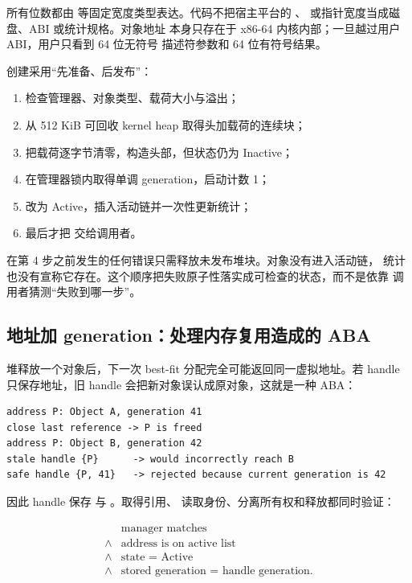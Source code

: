 所有位数都由  等固定宽度类型表达。代码不把宿主平台的
、 或指针宽度当成磁盘、ABI 或统计规格。对象地址
本身只存在于 x86-64 内核内部；一旦越过用户 ABI，用户只看到 64 位无符号
描述符参数和 64 位有符号结果。

创建采用“先准备、后发布”：

\begin{enumerate}
  \item 检查管理器、对象类型、载荷大小与溢出；
  \item 从 512 KiB 可回收 kernel heap 取得头加载荷的连续块；
  \item 把载荷逐字节清零，构造头部，但状态仍为 Inactive；
  \item 在管理器锁内取得单调 generation，启动计数 1；
  \item 改为 Active，插入活动链并一次性更新统计；
  \item 最后才把  交给调用者。
\end{enumerate}

在第 4 步之前发生的任何错误只需释放未发布堆块。对象没有进入活动链，
统计也没有宣称它存在。这个顺序把失败原子性落实成可检查的状态，而不是依靠
调用者猜测“失败到哪一步”。

\subsection{地址加 generation：处理内存复用造成的 ABA}

堆释放一个对象后，下一次 best-fit 分配完全可能返回同一虚拟地址。若 handle
只保存地址，旧 handle 会把新对象误认成原对象，这就是一种 ABA：

\begin{lstlisting}[caption={地址复用时由 generation 拒绝旧 handle}]
address P: Object A, generation 41
close last reference -> P is freed
address P: Object B, generation 42
stale handle {P}      -> would incorrectly reach B
safe handle {P, 41}   -> rejected because current generation is 42
\end{lstlisting}

因此 handle 保存  与 。取得引用、
读取身份、分离所有权和释放都同时验证：

\[
\begin{aligned}
  &\text{manager matches}\\
  {}\land{}&\text{address is on active list}\\
  {}\land{}&\text{state = Active}\\
  {}\land{}&\text{stored generation = handle generation}.
\end{aligned}
\]

